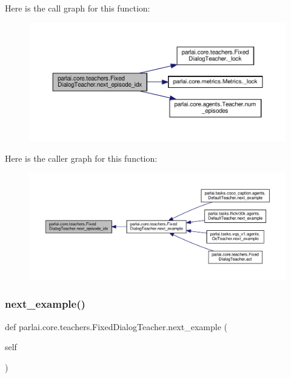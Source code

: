 Here is the call graph for this function\+:
\nopagebreak
\begin{figure}[H]
\begin{center}
\leavevmode
\includegraphics[width=350pt]{classparlai_1_1core_1_1teachers_1_1FixedDialogTeacher_a7fccfc09aef3510f8bb9834398eff8e9_cgraph}
\end{center}
\end{figure}
Here is the caller graph for this function\+:
\nopagebreak
\begin{figure}[H]
\begin{center}
\leavevmode
\includegraphics[width=350pt]{classparlai_1_1core_1_1teachers_1_1FixedDialogTeacher_a7fccfc09aef3510f8bb9834398eff8e9_icgraph}
\end{center}
\end{figure}
\mbox{\label{classparlai_1_1core_1_1teachers_1_1FixedDialogTeacher_aa6782a610b00aa0675522aa58b03f20c}} 
\subsubsection{\texorpdfstring{next\+\_\+example()}{next\_example()}}
{\footnotesize\ttfamily def parlai.\+core.\+teachers.\+Fixed\+Dialog\+Teacher.\+next\+\_\+example (\begin{DoxyParamCaption}\item[{}]{self }\end{DoxyParamCaption})}

